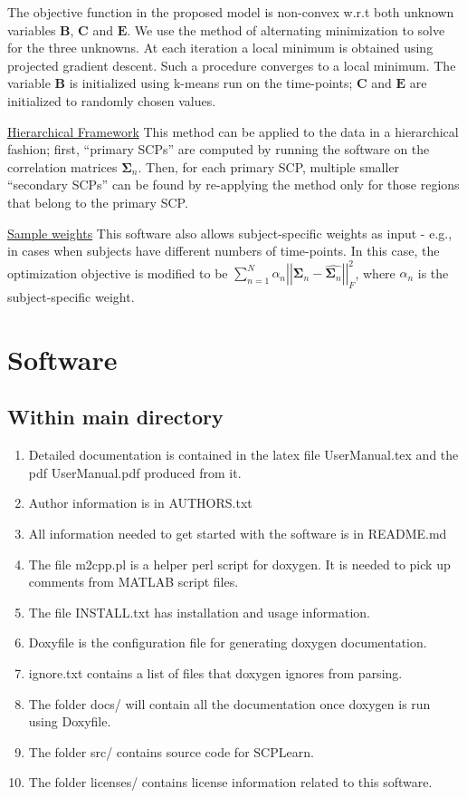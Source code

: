 \documentclass[12pt]{article}
\newcommand{\bB}{\mathbf{B}}
\newcommand{\bC}{\mathbf{C}}
\newcommand{\bE}{\mathbf{E}}
\newcommand{\bSigma}{\mathbf{\Sigma}}
\begin{document}
The objective function in the proposed model is non-convex w.r.t both unknown variables $\bB$, $\bC$ and $\bE$.  We use the method of alternating minimization to solve for the three unknowns.  At each iteration a local minimum is obtained using projected gradient descent. Such a procedure converges to a local minimum. The variable $\bB$ is initialized using k-means run on the time-points; $\bC$ and $\bE$ are initialized to randomly chosen values.

\underline{Hierarchical Framework}
This method can be applied to the data in a hierarchical fashion; first, ``primary SCPs'' are computed by running the software on the correlation matrices $\bSigma_n$. Then, for each primary SCP, multiple smaller ``secondary SCPs'' can be found by re-applying the method only for those regions that belong to the primary SCP. 

\underline{Sample weights}
This software also allows subject-specific weights as input - e.g., in cases when subjects have different numbers of time-points. In this case, the optimization objective is modified to be  $\sum_{n=1}^{N} \alpha_n \left| \left| \bSigma_n - \hat{\bSigma_n} \right| \right|_{F} ^{2}$, where $\alpha_n$ is the subject-specific weight.

\section{Software}

\subsection{Within main directory}
\begin{enumerate}
\item Detailed documentation is contained in the latex file {\color{brown}UserManual.tex} and the pdf {\color{brown}UserManual.pdf}  produced from it.
\item Author information is in {\color{brown}AUTHORS.txt}
\item All information needed to get started with the software is in {\color{brown}README.md}
\item The file {\color{brown}m2cpp.pl} is a helper perl script for doxygen. It is needed to pick up comments from MATLAB script files.
\item The file {\color{brown}INSTALL.txt} has installation and usage information.
\item {\color{brown}Doxyfile} is the configuration file for generating doxygen documentation.
\item {\color{brown}ignore.txt} contains a list of files that doxygen ignores from parsing.
\item The folder {\color{brown}docs/} will contain all the documentation once doxygen is run using {\color{brown}Doxyfile}.
\item The folder {\color{brown}src/} contains source code for SCPLearn.
\item The folder {\color{brown}licenses/} contains license information related to this software.
\end{enumerate}
\end{document}
